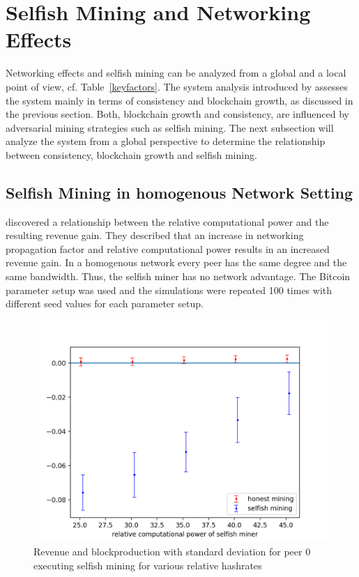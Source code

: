 \section{Selfish Mining and Networking Effects}
Networking effects and selfish mining can be analyzed from a global and a local point of view, cf. Table~\ref{keyfactors}. The system analysis introduced by \gopalan assesses the system mainly in terms of consistency and blockchain growth, as discussed in the previous section. Both, blockchain growth and consistency, are influenced by adversarial mining strategies such as selfish mining. The next subsection will analyze the system from a global perspective to determine the relationship between consistency, blockchain growth and selfish mining. 


\subsection{Selfish Mining in homogenous Network Setting}
 discovered a relationship between the relative computational power and the resulting revenue gain. They described that an increase in networking propagation factor and relative computational power results in an increased revenue gain. In a homogenous network every peer has the same degree and the same bandwidth. Thus, the selfish miner has no network advantage. The Bitcoin parameter setup was used and the simulations were repeated 100 times with different seed values for each parameter setup.
\begin{figure}[ht]
	\includegraphics[width=\textwidth]{figures/multi_hr_sm_gain.png}
	\caption{Revenue and blockproduction with standard deviation for peer $0$ executing selfish mining for various relative hashrates}
	\label{fig:multi_hr}
\end{figure}
